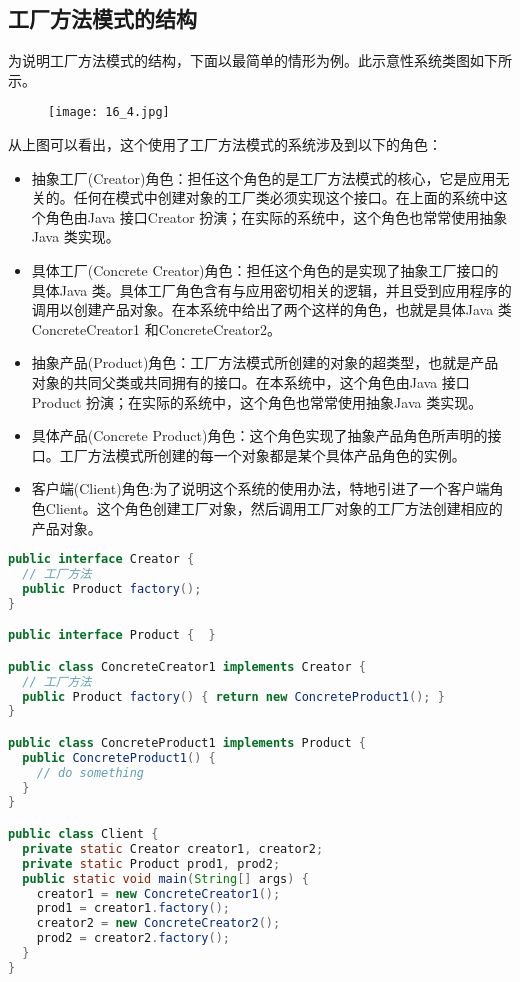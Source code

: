 \documentclass[../main.tex]{subfiles}
\begin{document}
\subsection{工厂方法模式的结构}
\noindent 为说明工厂方法模式的结构，下面以最简单的情形为例。此示意性系统类图如下所示。
%
\begin{figure}[H]
  \texttt{[image: 16\_4.jpg]}
\end{figure}
%
从上图可以看出，这个使用了工厂方法模式的系统涉及到以下的角色：
\begin{itemize}
  \item 抽象工厂(Creator)角色：担任这个角色的是工厂方法模式的核心，它是应用无关的。任何在模式中创建对象的工厂类必须实现这个接口。在上面的系统中这个角色由Java 接口Creator 扮演；在实际的系统中，这个角色也常常使用抽象Java 类实现。
  \item 具体工厂(Concrete Creator)角色：担任这个角色的是实现了抽象工厂接口的具体Java 类。具体工厂角色含有与应用密切相关的逻辑，并且受到应用程序的调用以创建产品对象。在本系统中给出了两个这样的角色，也就是具体Java 类ConcreteCreator1 和ConcreteCreator2。
  \item 抽象产品(Product)角色：工厂方法模式所创建的对象的超类型，也就是产品对象的共同父类或共同拥有的接口。在本系统中，这个角色由Java 接口Product 扮演；在实际的系统中，这个角色也常常使用抽象Java 类实现。
  \item 具体产品(Concrete Product)角色：这个角色实现了抽象产品角色所声明的接口。工厂方法模式所创建的每一个对象都是某个具体产品角色的实例。
  \item 客户端(Client)角色:为了说明这个系统的使用办法，特地引进了一个客户端角色Client。这个角色创建工厂对象，然后调用工厂对象的工厂方法创建相应的产品对象。
\end{itemize}
%
\begin{lstlisting}[language=java]
public interface Creator {
  // 工厂方法
  public Product factory();
}

public interface Product {  }

public class ConcreteCreator1 implements Creator {
  // 工厂方法
  public Product factory() { return new ConcreteProduct1(); }
}

public class ConcreteProduct1 implements Product {
  public ConcreteProduct1() {
    // do something
  }
}

public class Client {
  private static Creator creator1, creator2;
  private static Product prod1, prod2;
  public static void main(String[] args) {
    creator1 = new ConcreteCreator1();
    prod1 = creator1.factory();
    creator2 = new ConcreteCreator2();
    prod2 = creator2.factory();
  }
}
\end{lstlisting}
\end{document}
